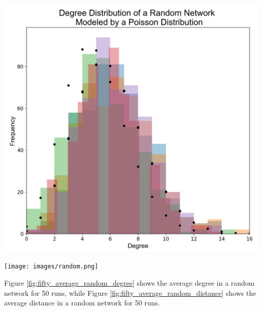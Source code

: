 \documentclass[journal]{IEEEtran}
\begin{document}
\begingroup
    \centering
    \medskip
    \includegraphics[width=\columnwidth]{images/rand_dist_5.png}
    \label{fig:random_histogram}
    \medskip
\endgroup

\bigskip
\bigskip
\bigskip

\begingroup
    \centering
    \medskip
    \texttt{[image: images/random.png]}
    \label{fig:random_network}
    \medskip
\endgroup

\newpage

\noindent Figure \ref{fig:fifty_average_random_degree} shows the average degree in a random network for 50 runs, while Figure \ref{fig:fifty_average_random_distance} shows the average distance in a random network for 50 runs.
\end{document}
